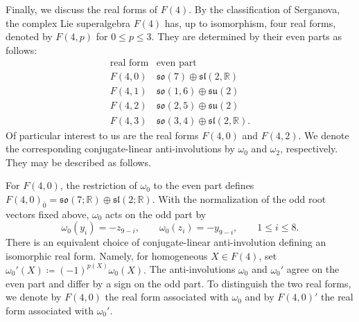 Finally, we discuss the real forms of $F(4)$. By the classification of
Serganova, the complex Lie superalgebra $F(4)$ has, up to isomorphism,
four real forms, denoted by $F(4,p)$ for $0\leq p\leq3$. They are
determined by their even parts as follows:
\begin{equation}
\begin{array}{c|c}
\text{real form} & \text{even part}\\
\hline
F(4,0)
&
\mathfrak{so}(7)\oplus\mathfrak{sl}(2,\mathbb R)
\\
F(4,1)
&
\mathfrak{so}(1,6)\oplus\mathfrak{su}(2)
\\
F(4,2)
&
\mathfrak{so}(2,5)\oplus\mathfrak{su}(2)
\\
F(4,3)
&
\mathfrak{so}(3,4)\oplus\mathfrak{sl}(2,\mathbb R).
\end{array}
\end{equation}
Of particular interest to us are the real forms $F(4,0)$ and $F(4,2)$. We denote the corresponding conjugate-linear anti-involutions by $\omega_{0}$ and $\omega_{2}$, respectively. They may be described as follows.

For $F(4,0)$, the restriction of $\omega_0$ to the even part defines
$
F(4,0)_{\bar0}
=
\mathfrak{so}(7;\mathbb R)\oplus\mathfrak{sl}(2;\mathbb R).
$
With the normalization of the odd root vectors fixed above,
$\omega_0$ acts on the odd part by
\begin{equation}
\omega_0(y_i)=-z_{9-i},
\qquad
\omega_0(z_i)=-y_{9-i},
\qquad
1\leq i\leq8.
\end{equation}
There is an equivalent choice of conjugate-linear anti-involution
defining an isomorphic real form. Namely, for homogeneous
$X\in F(4)$, set
$
\omega_0'(X)
\coloneqq (-1)^{p(X)}\omega_0(X).
$
The anti-involutions $\omega_0$ and $\omega_0'$ agree on the even part and differ by a sign on the odd part. To distinguish the two real forms, we denote by $F(4,0)$ the real form associated with $\omega_0$ and by
$F(4,0)'$ the real form associated with $\omega_0'$.  


